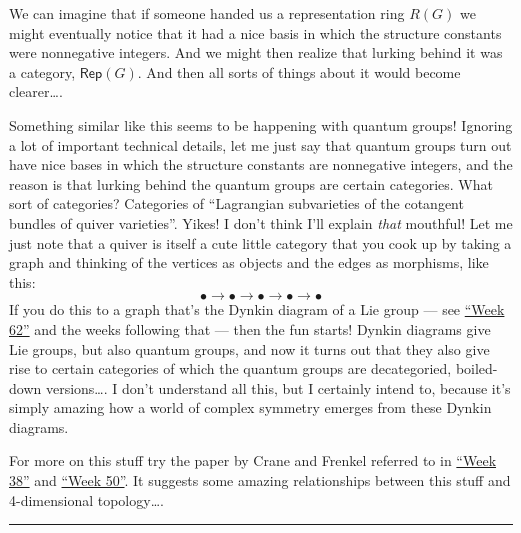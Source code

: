 \documentclass{article}
\begin{document}
We can imagine that if someone handed us a representation ring \(R(G)\)
we might eventually notice that it had a nice basis in which the
structure constants were nonnegative integers. And we might then realize
that lurking behind it was a category, \(\mathsf{Rep}(G)\). And then all
sorts of things about it would become clearer\ldots.

Something similar like this seems to be happening with quantum groups!
Ignoring a lot of important technical details, let me just say that
quantum groups turn out have nice bases in which the structure constants
are nonnegative integers, and the reason is that lurking behind the
quantum groups are certain categories. What sort of categories?
Categories of ``Lagrangian subvarieties of the cotangent bundles of
quiver varieties''. Yikes! I don't think I'll explain \emph{that}
mouthful! Let me just note that a quiver is itself a cute little
category that you cook up by taking a graph and thinking of the vertices
as objects and the edges as morphisms, like this:
\[\bullet\to\bullet\to\bullet\to\bullet\to\bullet\] If you do this to a
graph that's the Dynkin diagram of a Lie group --- see
\protect\hyperlink{week62}{``Week 62''} and the weeks following that ---
then the fun starts! Dynkin diagrams give Lie groups, but also quantum
groups, and now it turns out that they also give rise to certain
categories of which the quantum groups are decategoried, boiled-down
versions\ldots. I don't understand all this, but I certainly intend to,
because it's simply amazing how a world of complex symmetry emerges from
these Dynkin diagrams.

For more on this stuff try the paper by Crane and Frenkel referred to in
\protect\hyperlink{week38}{``Week 38''} and
\protect\hyperlink{week50}{``Week 50''}. It suggests some amazing
relationships between this stuff and 4-dimensional topology\ldots.

\begin{center}\rule{0.5\linewidth}{0.5pt}\end{center}
\end{document}

